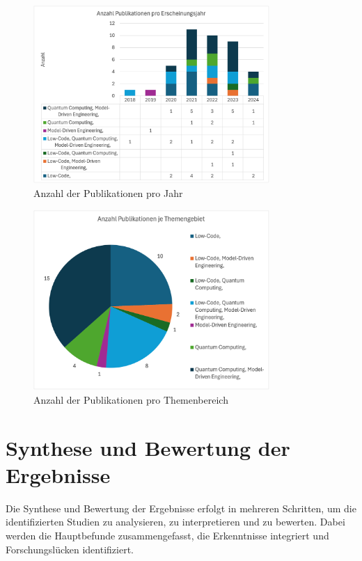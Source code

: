 \begin{figure}[h!]
    \centering
    \includegraphics[width=0.8\textwidth]{graphics/anzahl_pubs_jahr.png}
    \caption{Anzahl der Publikationen pro Jahr}
    \label{fig:publications_per_year}
\end{figure}

\begin{figure}[h!]
    \centering
    \includegraphics[width=0.8\textwidth]{graphics/anzahl_themen_pubs.png}
    \caption{Anzahl der Publikationen pro Themenbereich}
    \label{fig:publications_per_topic}
\end{figure}

\section{Synthese und Bewertung der Ergebnisse}
Die Synthese und Bewertung der Ergebnisse erfolgt in mehreren Schritten, um die identifizierten Studien zu analysieren, 
zu interpretieren und zu bewerten. Dabei werden die Hauptbefunde zusammengefasst, die Erkenntnisse integriert und 
Forschungslücken identifiziert. 

